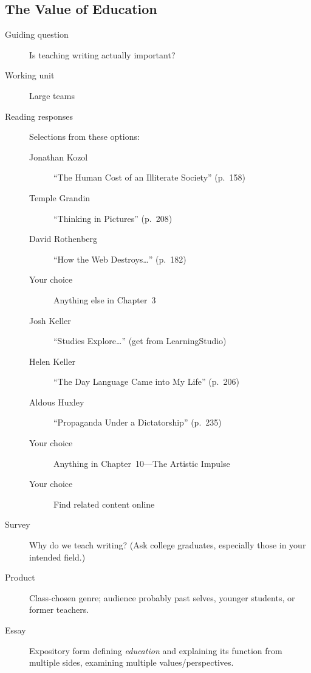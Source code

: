 \documentclass[12pt,oneside]{amsart}	%
\begin{document}
\subsection{The Value of Education} %
\label{sub:the_value_of_education}
\begin{description}
	\item[Guiding question] Is teaching writing actually important?
	\item [Working unit] Large teams
	\item [Reading responses] Selections from these options:
	\begin{description}
		\item[Jonathan Kozol] ``The Human Cost of an Illiterate Society'' (p.~158)
		\item[Temple Grandin] ``Thinking in Pictures'' (p.~208)
		\item[David Rothenberg] ``How the Web Destroys…'' (p.~182)
		\item[Your choice] Anything else in Chapter~3
		\item[Josh Keller] ``Studies Explore…'' (get from LearningStudio)
		\item[Helen Keller] ``The Day Language Came into My Life'' (p.~206)
		\item[Aldous Huxley] ``Propaganda Under a Dictatorship'' (p.~235)
		\item[Your choice] Anything in Chapter~10—The Artistic Impulse
		\item[Your choice] Find related content online
	\end{description}
	\item [Survey] Why do we teach writing? (Ask college graduates, especially those in your intended field.)
	\item [Product] Class-chosen genre; audience probably past selves, younger students, or former teachers.
	\item [Essay] Expository form defining \emph{education} and explaining its function from multiple sides, examining multiple values/perspectives.
\end{description}
\end{document}
